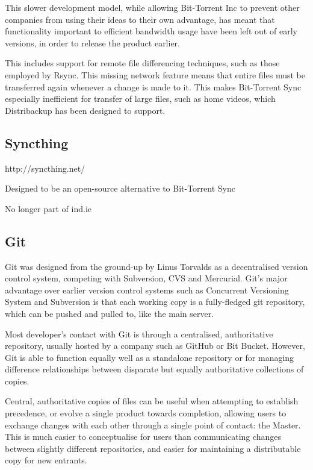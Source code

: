 \documentclass[12pt,a4paper,]{adreport}
\begin{document}
This slower development model, while allowing Bit-Torrent Inc to prevent
other companies from using their ideas to their own advantage, has meant
that functionality important to efficient bandwidth usage have been left
out of early versions, in order to release the product earlier.

This includes support for remote file differencing techniques, such as
those employed by Rsync. This missing network feature means that entire
files must be transferred again whenever a change is made to it. This
makes Bit-Torrent Sync especially inefficient for transfer of large
files, such as home videos, which Distribackup has been designed to
support.

\subsection{Syncthing}\label{syncthing}

http://syncthing.net/

Designed to be an open-source alternative to Bit-Torrent Sync

No longer part of ind.ie

\subsection{Git}\label{git}

Git was designed from the ground-up by Linus Torvalds as a decentralised
version control system, competing with Subversion, CVS and Mercurial.
Git's major advantage over earlier version control systems such as
Concurrent Versioning System and Subversion is that each working copy is
a fully-fledged git repository, which can be pushed and pulled to, like
the main server.

Most developer's contact with Git is through a centralised,
authoritative repository, usually hosted by a company such as GitHub or
Bit Bucket. However, Git is able to function equally well as a
standalone repository or for managing difference relationships between
disparate but equally authoritative collections of copies.

Central, authoritative copies of files can be useful when attempting to
establish precedence, or evolve a single product towards completion,
allowing users to exchange changes with each other through a single
point of contact: the Master. This is much easier to conceptualise for
users than communicating changes between slightly different
repositories, and easier for maintaining a distributable copy for new
entrants.
\end{document}
